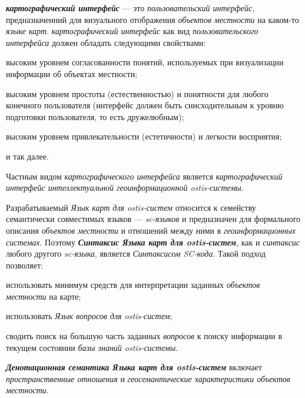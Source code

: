 \textbf{\textit{картографический интерфейс}} --- это \textit{пользовательский интерфейс}, предназначенний для визуального отображения \textit{объектов местности} на каком-то \textit{языке карт}.
\textit{картографический интерфейс} как вид \textit{пользовательского интерфейса} должен обладать следующими свойствами:
\begin{textitemize}
	\item высоким уровнем согласованности понятий, используемых при визуализации информации об объектах местности;
	\item высоким уровнем простоты (естественностью) и понятности для любого конечного пользователя (интерфейс должен быть снисходительным к уровню подготовки пользователя, то есть дружелюбным);
	\item высоким уровнем привлекательности (естетичности) и легкости восприятия;
	\item и так далее.
\end{textitemize}

Частным видом \textit{картографического интерфейса} является \textit{картографический интерфейс интеллектуальной геоинформационной ostis-системы}.

Разрабатываемый \textit{Язык карт для ostis-систем} относится к семейству семантически совместимых языков --- \textit{sc-языков} и предназначен для формального описания \textit{объектов местности} и отношений между ними в \textit{геоинформационных системах}. Поэтому \textbf{\textit{Синтаксис Языка карт для ostis-систем}}, как и \textit{синтаксис} любого другого \textit{sc-языка}, является \textit{Синтаксисом SC-кода}. Такой подход позволяет:
\begin{textitemize}
\item использовать минимум средств для интерпретации заданных \textit{объектов местности} на карте;
\item использовать \textit{Язык вопросов для ostis-систем};
\item сводить поиск на большую часть заданных \textit{вопросов} к поиску информации в текущем состоянии \textit{базы знаний ostis-системы}.
\end{textitemize}

\textbf{\textit{Денотационная семантика Языка карт для ostis-систем}} включает \textit{пространственные отношения} и \textit{геосемантические характеристики объектов местности}.

